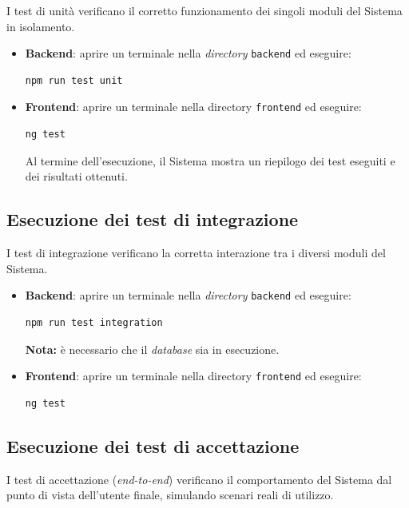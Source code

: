 \documentclass[10pt, letterpaper]{article}
\begin{document}
I test di unità verificano il corretto funzionamento dei singoli moduli del Sistema in isolamento.
\begin{itemize}
      \item \textbf{Backend}: aprire un terminale nella \textit{directory} \texttt{backend} ed eseguire:
      \begin{verbatim}npm run test unit\end{verbatim}
      \item \textbf{Frontend}: aprire un terminale nella directory \texttt{frontend} ed eseguire:
      \begin{verbatim}ng test\end{verbatim}
      Al termine dell'esecuzione, il Sistema mostra un riepilogo dei test eseguiti e dei risultati ottenuti.
\end{itemize}

\subsection{Esecuzione dei test di integrazione}

I test di integrazione verificano la corretta interazione tra i diversi moduli del Sistema.

\begin{itemize}
      \item \textbf{Backend}: aprire un terminale nella \textit{directory} \texttt{backend} ed eseguire:
      \begin{verbatim}npm run test integration\end{verbatim}
      \textbf{Nota:} è necessario che il \textit{database} sia in esecuzione.
      \item \textbf{Frontend}: aprire un terminale nella directory \texttt{frontend} ed eseguire:
      \begin{verbatim}ng test\end{verbatim}
\end{itemize}



\subsection{Esecuzione dei test di accettazione}

I test di accettazione (\textit{end-to-end}) verificano il comportamento del Sistema dal punto di vista dell'utente finale, simulando scenari reali di utilizzo.
\end{document}
